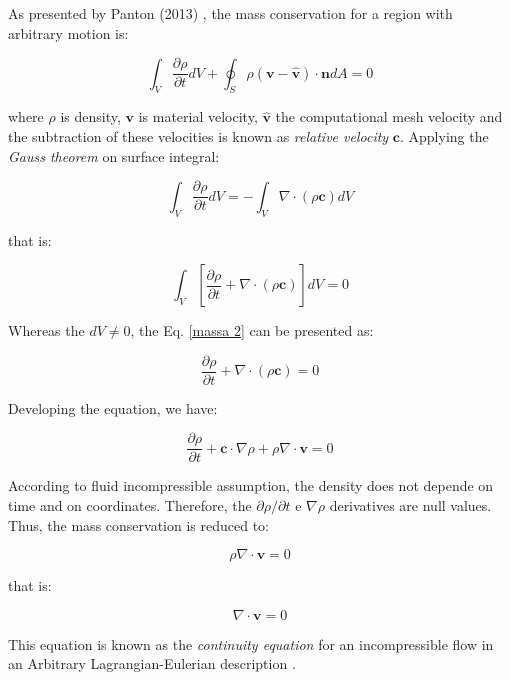 As presented by Panton (2013) \cite{panton2013},
the mass conservation for a region with arbitrary motion is:

\begin{equation} \label{mass arbitrary domain panton}
 \int_{V} \frac{\partial \rho}{\partial t} dV
 + 
 \oint_{S} \rho 
 \left( \textbf{v} - \hat{\textbf{v}} \right) 
 \cdot \textbf{n} dA
 = 0
\end{equation}

\medskip
\noindent 
where $\rho$ is density, 
$\textbf{v}$ is material velocity,
$\hat{\textbf{v}}$ the computational mesh velocity and
the subtraction of these velocities is known as
\textit{relative velocity} $\textbf{c}$.
Applying the \textit{Gauss theorem} on surface integral:

\begin{equation}
 \int_{V} \frac{\partial \rho}{\partial t} dV
 = - 
 \int_{V} \nabla \cdot \left( \rho \textbf{c} \right) dV
\end{equation}

\medskip
\noindent
that is:

\begin{equation} \label{massa 2}
 \int_{V} \left[ \frac{\partial \rho}{\partial t}
 + 
 \nabla \cdot 
\left( \rho \textbf{c} \right) 
\right] dV 
 = 0 
\end{equation}

\medskip
\noindent 
Whereas the $dV \neq 0$,
the Eq. \ref{massa 2} can be presented as:

\begin{equation} \label{continuity equation}
 \frac{\partial \rho}{\partial t}
 + 
 \nabla \cdot 
\left( \rho \textbf{c} \right) 
 = 0 
\end{equation}

\medskip
\noindent
Developing the equation, we have:

\begin{equation}
 \frac{\partial \rho}{\partial t}
 +
 \textbf{c} \cdot \nabla \rho
 +
 \rho \nabla \cdot \textbf{v}
 = 0
\end{equation}

\medskip
According to fluid incompressible assumption,
the density does not depende on time and on coordinates.
Therefore, the 
$\partial \rho / \partial t$ e $\nabla \rho$ derivatives are 
null values.
Thus, the mass conservation is reduced to:

\begin{equation} \label{massa 3}
 \rho \nabla \cdot \textbf{v}
 = 0 
\end{equation}

\medskip
\noindent that is:

\begin{equation} \label{incompressible continuity equation}
 \nabla \cdot \textbf{v}
 = 0 
\end{equation}

\medskip
\noindent 
This equation is known as the \textit{continuity equation} 
for an incompressible flow
in an Arbitrary Lagrangian-Eulerian description \cite{donea1982}.


\newpage



